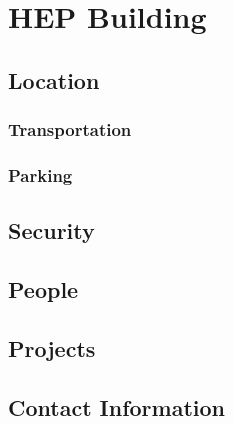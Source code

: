 
\chapter{HEP Building}
\label{chap:eq_building}


\section{Location}
\label{sec:eq_building:location}

\subsection{Transportation}
\label{sec:eq_building:transportation}

\subsection{Parking}
\label{sec:eq_building:parking}

\section{Security}
\label{sec:eq_building:security}


\section{People}
\label{sec:eq_building:people}

\section{Projects}
\label{sec:eq_building:projects}


\section{Contact Information}
\label{sec:eq_building:contact}



